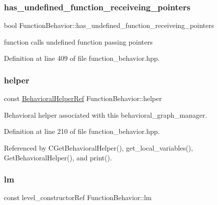 \subsubsection{\texorpdfstring{has\+\_\+undefined\+\_\+function\+\_\+receiveing\+\_\+pointers}{has\_undefined\_function\_receiveing\_pointers}}
{\footnotesize\ttfamily bool Function\+Behavior\+::has\+\_\+undefined\+\_\+function\+\_\+receiveing\+\_\+pointers\hspace{0.3cm}{\ttfamily [private]}}



function calls undefined function passing pointers 



Definition at line 409 of file function\+\_\+behavior.\+hpp.

\mbox{\label{classFunctionBehavior_a69d523d2586e3b825d2f5f68d7e99b0c}} 
\subsubsection{\texorpdfstring{helper}{helper}}
{\footnotesize\ttfamily const \hyperlink{behavioral__helper_8hpp_a9da8798985d185e76cbde965d9d68f84}{Behavioral\+Helper\+Ref} Function\+Behavior\+::helper\hspace{0.3cm}{\ttfamily [private]}}



Behavioral helper associated with this behavioral\+\_\+graph\+\_\+manager. 



Definition at line 210 of file function\+\_\+behavior.\+hpp.



Referenced by C\+Get\+Behavioral\+Helper(), get\+\_\+local\+\_\+variables(), Get\+Behavioral\+Helper(), and print().

\mbox{\label{classFunctionBehavior_a8fd0e89ba2e18a95dcced1fdb2a813fb}} 
\subsubsection{\texorpdfstring{lm}{lm}}
{\footnotesize\ttfamily const level\+\_\+constructor\+Ref Function\+Behavior\+::lm}



